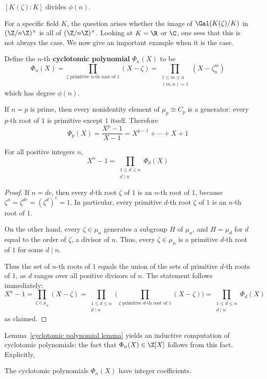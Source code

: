 $[K(\zeta):K]$ divides $\phi(n)$.\par
For a specific field $K$, the question arises whether the image of $\Gal(K(\zeta)/K)$ in $(\Z/n\Z)^\times$ is all of $(\Z/n\Z)^\times$. Looking at $K=\R$ or $\C$, one sees that this is not always the case. We now give an important example when it is the case.\par
Define the $n$-th \textbf{cyclotomic polynomial} $\Phi_n(X)$ to be
\[\Phi_n(X)=\prod_{\zeta\text{ primitive $n$-th root of }1}(X-\zeta)=\prod_{\substack{1\leq m\leq n\\(m,n)=1}}(X-\zeta_n^m)\]
which has degree $\phi(n)$.
\begin{example}
If $n=p$ is prime, then every nonidentity element of $\mu_p\cong C_p$ is a generator: every $p$-th root of $1$ is primitive except $1$ itself. Therefore
\[\Phi_p(X)=\dfrac{X^p-1}{X-1}=X^{p-1}+\cdots+X+1\]
\end{example}
\begin{lemma}\label{cyclotomic polynomial lemma}
For all positive integers $n$,
\[X^n-1=\prod_{\substack{1\leq d\leq n\\d\mid n}}\Phi_d(X)\]
\end{lemma}
\begin{proof}
If $n=de$, then every $d$-th root $\zeta$ of $1$ is an $n$-th root of $1$, because $\zeta^n=\zeta^{de}=(\zeta^d)^e=1$. In particular, every primitive $d$-th root $\zeta$ of $1$ is an $n$-th root of $1$.\par
On the other hand, every $\zeta\in \mu_n$ generates a subgroup $H$ of $\mu_n$, and $H=\mu_d$ for
$d$ equal to the order of $\zeta$, a divisor of $n$. Thus, every $\zeta\in \mu_n$ is a primitive $d$-th root of $1$ for some $d\mid n$.\par
Thus the set of $n$-th roots of $1$ equals the union of the sets of primitive $d$-th roots of $1$, as $d$ ranges over all positive divisors of $n$. The statement follows immediately:
\[X^n-1=\prod_{\zeta\in \mu_n}(X-\zeta)=\prod_{\substack{1\leq d\leq n\\d\mid n}}\Bigg(\prod_{\zeta\text{ primitive $d$-th root of }1}(X-\zeta)\Bigg)=\prod_{\substack{1\leq d\leq n\\d\mid n}}\Phi_d(X)\]
as claimed.
\end{proof}
Lemma~\ref{cyclotomic polynomial lemma} yields an inductive computation of cyclotomic polynomials; the fact that $\Phi_n(X)\in\Z[X]$ follows from this fact. Explicitly,
\begin{corollary}
The cyclotomic polynomials $\Phi_n(X)$ have integer coefficients.
\end{corollary}
